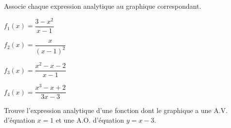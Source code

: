 \documentclass[a4paper,12pt]{report}
\begin{document}
\begin{exercice}
Associe chaque expression analytique au graphique correspondant.

\par \setlength{\columnseprule}{0 pt}
          \begin{minipage}[t]{\linewidth}
          \begin{multicols}{4}
\(f_1(x)=\dfrac{3-x^2}{x-1}\)

\(f_2(x)=\dfrac{x}{(x-1)^2}\)

\(f_3(x)=\dfrac{x^2-x-2}{x-1}\)

\(f_4(x)=\dfrac{x^3-x+2}{3x-3}\)


\end{multicols}\end{minipage}
\begin{center}

\end{center}
\end{exercice}
\begin{exercice}
Trouve l'expression analytique d'une fonction dont le graphique a une
A.V. d'équation \(x=1\) et une A.O. d'équation \(y=x-3\).
\end{exercice}
\end{document}

